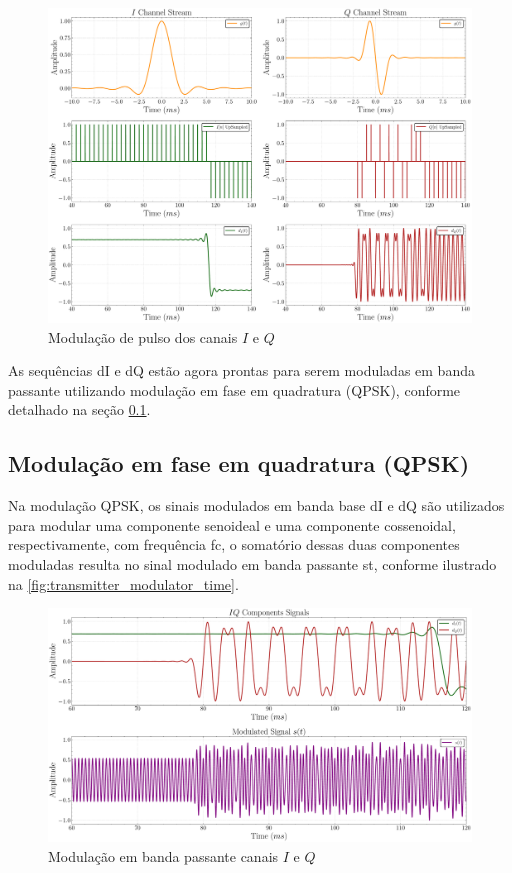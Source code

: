 \begin{figure}[H]
	\centering
	\caption{Modulação de pulso dos canais $I$ e $Q$}\label{fig:transmitter_formatter_time}
	\includegraphics[width=\linewidth]{assets/cap3/transmitter_formatter_time_comp.pdf}
\end{figure}

As sequências \gls{dI} e \gls{dQ} estão agora prontas para serem moduladas em banda passante utilizando modulação em fase em quadratura (\gls{QPSK}), conforme detalhado na seção \ref{sec:qpsk}.

\subsection{Modulação em fase em quadratura (QPSK)}\label{sec:qpsk}

Na modulação \gls{QPSK}, os sinais modulados em banda base \gls{dI} e \gls{dQ} são utilizados para modular uma componente senoideal e uma componente cossenoidal, respectivamente, com frequência \gls{fc}, o somatório dessas duas componentes moduladas resulta no sinal modulado em banda passante \gls{st}, conforme ilustrado na \autoref{fig:transmitter_modulator_time}.

\begin{figure}[H]
	\centering
	\caption{Modulação em banda passante canais $I$ e $Q$}\label{fig:transmitter_modulator_time}
	\includegraphics[width=\linewidth]{assets/cap3/transmitter_modulator_time.pdf}
\end{figure}

